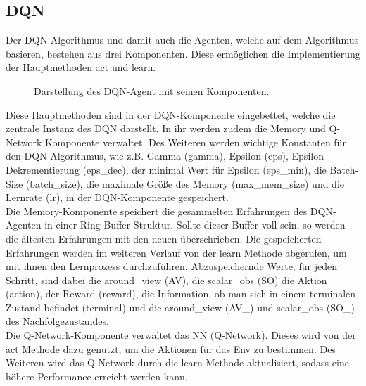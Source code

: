 \subsection{DQN}
Der DQN Algorithmus und damit auch die Agenten, welche auf dem Algorithmus basieren, bestehen aus drei Komponenten. Diese ermöglichen die Implementierung der Hauptmethoden act und learn.
\begin{figure}[H]
	\centering
	\def\svgscale{0.18}
	
	\caption[DQN-Agent]{Darstellung des DQN-Agent mit seinen Komponenten.}
	\label{fig:DQN-Agent}
\end{figure}
Diese Hauptmethoden sind in der DQN-Komponente eingebettet, welche die zentrale Instanz des DQN darstellt. In ihr werden zudem die Memory und Q-Network Komponente verwaltet. Des Weiteren werden wichtige Konstanten für den DQN Algorithmus, wie z.B. Gamma (gamma), Epsilon (eps), Epsilon-Dekrementierung (eps\_dec), der minimal Wert für Epsilon (eps\_min), die Batch-Size (batch\_size), die maximale Größe des Memory (max\_mem\_size) und die Lernrate (lr), in der DQN-Komponente gespeichert.\\
Die Memory-Komponente speichert die gesammelten Erfahrungen des DQN-Agenten in einer Ring-Buffer Struktur. Sollte dieser Buffer voll sein, so werden die ältesten Erfahrungen mit den neuen überschrieben.
Die gespeicherten Erfahrungen werden im weiteren Verlauf von der learn Methode abgerufen, um mit ihnen den Lernprozess durchzuführen. Abzuspeichernde Werte, für jeden Schritt, sind dabei die around\_view (AV), die scalar\_obs (SO) die Aktion (action), der Reward (reward), die Information, ob man sich in einem terminalen Zustand befindet (terminal) und die around\_view (AV\_) und scalar\_obs (SO\_) des Nachfolgezustandes. \\
Die Q-Network-Komponente verwaltet das NN (Q-Network). Dieses wird von der act Methode dazu genutzt, um die Aktionen für das Env zu bestimmen. Des Weiteren wird das Q-Network durch die learn Methode aktualisiert, sodass eine höhere Performance erreicht werden kann.

